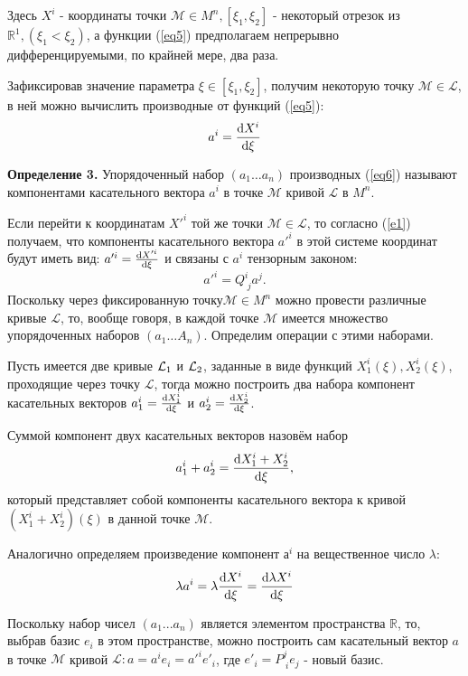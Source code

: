 \documentclass[14pt,a4paper]{scrartcl}
\begin{document}
Здесь $X^i$ - координаты точки $\mathcal{M} \in M^n, [\xi_1, \xi_2]$ - некоторый отрезок из $\mathbb{R}^1, (\xi_1 < \xi_2)$, а функции (\ref{eq5}) предполагаем непрерывно дифференцируемыми, по крайней мере, два раза.


Зафиксировав значение параметра $\xi \in [\xi_1,\xi_2]$, получим некоторую точку $\mathcal{M} \in \mathcal{L}$, в ней можно вычислить производные от функций (\ref{eq5}):
\begin{equation}\label{eq6}
	a^i = \dv{X^i}{\xi}
\end{equation}

\textbf{Определение 3.} Упорядоченный набор $(a_1\dots a_n)$ производных (\ref{eq6}) называют компонентами касательного вектора $a^i$ в точке $\mathcal{M}$ кривой $\mathcal{L}$ в $ M^n $.

Если перейти к координатам $X'^i$ той же точки $\mathcal{M} \in \mathcal{L}$, то согласно (\ref{e1}) получаем, что компоненты касательного вектора $a'^i$ в этой системе координат будут иметь вид: $a'^i = \dv{X'^i}{\xi}$ и связаны с $a^i$ тензорным законом:
\begin{equation}\label{eq7}
	a'^i = Q_{\; j}^i a^j.
\end{equation}
Поскольку через фиксированную точку$\mathcal{M} \in M^n$ можно провести различные кривые $\mathcal{L}$, то, вообще говоря, в каждой точке $\mathcal{M}$ имеется множество упорядоченных наборов $(a_1\dots A_n)$. Определим операции с этими наборами.

Пусть имеется две кривые $\mathcal{L_\textup{1}}$ и $\mathcal{L_\textup{2}}$, заданные в виде функций $X_1^i(\xi), X_2^i(\xi)$, проходящие через точку $\mathcal{L}$, тогда можно построить два набора компонент касательных векторов $a_1^i = \dv{X_1^i}{\xi}$ и $a_2^i = \dv{X_2^i}{\xi}$.

Суммой компонент двух касательных векторов назовём набор
\begin{equation}\label{eq8}
	a_1^i + a_2^i = \dv{X_1^i + X_2^i}{\xi},
\end{equation}
который представляет собой компоненты касательного вектора к кривой $(X_1^i + X_2^i)(\xi)$ в данной точке $\mathcal{M}$.

Аналогично определяем произведение компонент $а^i$ на вещественное число $\lambda$:
\begin{equation}\label{eq9}
	\lambda a^i = \lambda \dv{X^i}{\xi} = \dv{\lambda X^i}{\xi}
\end{equation}

Поскольку набор чисел $(a_1 ...a_n)$ является элементом пространства $\mathbb{R}$, то, выбрав базис $e_i$ в этом пространстве, можно построить сам касательный вектор $a$ в точке $\mathcal{M}$ кривой $\mathcal{L}: a = a^ie_i = a'^ie'_i$, где $e'_i = P_{\; i}^j e_j$ - новый базис.
\end{document}
